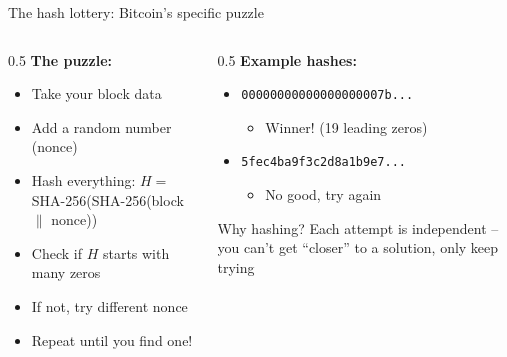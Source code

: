 \ifdefined\PRESENTATION\else\PassOptionsToClass{handout}{beamer}\fi\documentclass[aspectratio=169, lualatex]{beamer}
\begin{document}
\begin{frame}{The hash lottery: Bitcoin's specific puzzle}
	\begin{columns}[c]
		\begin{column}{0.5\textwidth}
			\textbf{The puzzle:}
			\begin{itemize}
				\item Take your block data
				\item Add a random number (nonce)
				\item Hash everything: $H =$ SHA-256(SHA-256(block $\|$ nonce))
				\item Check if $H$ starts with many zeros
				\item If not, try different nonce
				\item Repeat until you find one!
			\end{itemize}
		\end{column}
		\begin{column}{0.5\textwidth}
			\textbf{Example hashes:}
			\begin{itemize}
				\item \texttt{00000000000000000007b...}
				      \begin{itemize}
					      \item Winner! (19 leading zeros)
				      \end{itemize}
				\item \texttt{5fec4ba9f3c2d8a1b9e7...}
				      \begin{itemize}
					      \item No good, try again
				      \end{itemize}
			\end{itemize}
			\begin{exampleblock}{Why hashing?}
				Each attempt is independent -- you can't get ``closer'' to a solution, only keep trying
			\end{exampleblock}
		\end{column}
	\end{columns}
\end{frame}
\end{document}
